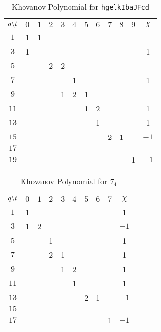 \begin{table}
    \centering
    \begin{tabular}{| c | c | c | c | c | c | c | c | c | c | c | c |}
        \hline
        $q\symbol{92}t$&$0$&$1$&$2$&$3$&$4$&$5$&$6$&$7$&$8$&$9$&$\chi$\\
        \hline
        $1$&1&1&&&&&&&&&\\
        \hline
        $3$&1&&&&&&&&&&1\\
        \hline
        $5$&&&2&2&&&&&&&\\
        \hline
        $7$&&&&&1&&&&&&1\\
        \hline
        $9$&&&&1&2&1&&&&&\\
        \hline
        $11$&&&&&&1&2&&&&1\\
        \hline
        $13$&&&&&&&1&&&&1\\
        \hline
        $15$&&&&&&&&2&1&&$-1$\\
        \hline
        $17$&&&&&&&&&&&\\
        \hline
        $19$&&&&&&&&&&1&$-1$\\
        \hline
    \end{tabular}
    \caption{Khovanov Polynomial for \texttt{hgelkIbaJFcd}}
\end{table}
\begin{table}
    \centering
    \begin{tabular}{| c | c | c | c | c | c | c | c | c | c |}
        \hline
        $q\symbol{92}t$&$0$&$1$&$2$&$3$&$4$&$5$&$6$&$7$&$\chi$\\
        \hline
        $1$&1&&&&&&&&1\\
        \hline
        $3$&1&2&&&&&&&$-1$\\
        \hline
        $5$&&&1&&&&&&1\\
        \hline
        $7$&&&2&1&&&&&1\\
        \hline
        $9$&&&&1&2&&&&1\\
        \hline
        $11$&&&&&1&&&&1\\
        \hline
        $13$&&&&&&2&1&&$-1$\\
        \hline
        $15$&&&&&&&&&\\
        \hline
        $17$&&&&&&&&1&$-1$\\
        \hline
    \end{tabular}
    \caption{Khovanov Polynomial for $7_{4}$}
\end{table}
